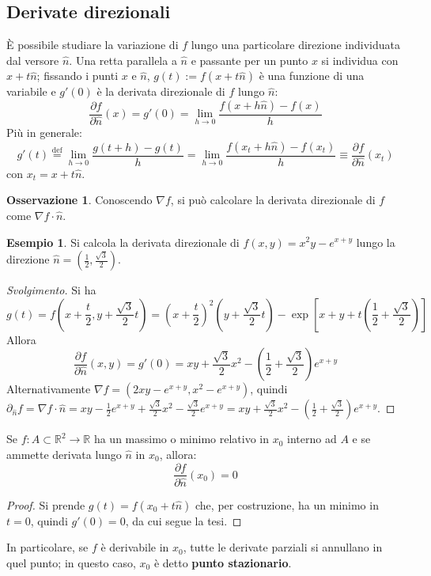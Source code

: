 \documentclass[11pt, a4paper]{scrartcl}
\newenvironment{svolgimento}{\renewcommand\qedsymbol{$\blacksquare$}\begin{proof}[Svolgimento]}{\end{proof}}
\theoremstyle{definition}
\newtheorem{esempio}{Esempio}
\numberwithin{esempio}{section}
\theoremstyle{definition}
\newtheorem{obs}{Osservazione}
\numberwithin{obs}{section}
\numberwithin{nota}{section}
\numberwithin{equation}{subsection}
\begin{document}
\subsection{Derivate direzionali}

\`E possibile studiare la variazione di $f$ lungo una particolare direzione individuata dal versore $\hat{n}$. Una retta parallela a $\hat{n}$ e passante per un punto $x$ si individua con $x+t \hat{n}$; fissando i punti $x$ e $\hat{n}$, $g(t) := f(x+t\hat{n})$ \`e una funzione di una variabile e $g'(0)$ \`e la derivata direzionale di $f$ lungo $\hat{n}$:
\begin{equation}
	\frac{\partial f}{\partial \hat{n}} (x) = g'(0) = \lim_{h \to 0} \frac{f(x+h\hat{n}) - f(x)}{h}
\end{equation}
Pi\`u in generale:
\begin{equation}
	g'(t) \overset{\text{def}}{=} \lim_{h \to 0} \frac{g(t+h) - g(t)}{h} = \lim_{h \to 0} \frac{f(x_t+ h \hat{n}) - f(x_t)}{h} \equiv \frac{\partial f}{\partial \hat{n}} (x_t)
\end{equation}
con $x_t = x+t \hat{n}$. 
\begin{obs}
	Conoscendo $\nabla f$, si pu\`o calcolare la derivata direzionale di $f$ come $\nabla f \cdot \hat{n}$.
\end{obs}
\begin{esempio}
	Si calcola la derivata direzionale di $f(x,y) = x^2 y - e^{x+y} $ lungo la direzione $\hat{n} = \left(\frac{1}{2}, \frac{\sqrt{3} }{2}\right) $.
	\begin{svolgimento}
		Si ha 
		\[
		g(t) = f\left(x + \frac{t}{2}, y + \frac{\sqrt{3} }{2}t\right) = \left(x + \frac{t}{2}\right) ^2 \left(y + \frac{\sqrt{3} }{2}t\right) - \exp \left[ x + y + t\left(\frac{1}{2} + \frac{\sqrt{3} }{2}\right)  \right] 
		\] 
		Allora 
		\[
		\frac{\partial f}{\partial \hat{n}} (x,y) = g'(0) = xy + \frac{\sqrt{3} }{2}x^2 - \left(\frac{1}{2}+ \frac{\sqrt{3} }{2} \right) e^{x+y} 
		\] 
		Alternativamente $\nabla f = \left(2xy - e^{x+y} , x^2 - e^{x+y} \right) $, quindi $\partial _{\hat{n}} f = \nabla f \cdot \hat{n} =xy - \frac{1}{2} e^{x+y} +\frac{\sqrt{3} }{2} x^2 - \frac{\sqrt{3} }{2}e^{x+y} = xy + \frac{\sqrt{3} }{2}x^2 - \left(\frac{1}{2}+\frac{\sqrt{3} }{2}\right) e^{x+y}   $.
	\end{svolgimento}
\end{esempio}
\begin{teorema}
	{}{}
	Se $f:A\subset \mathbb{R}^2 \to  \mathbb{R}$ ha un massimo o minimo relativo in $x_0$ interno ad $A$ e se ammette derivata lungo $\hat{n}$ in $x_0$, allora:
	\begin{equation}
		\frac{\partial f}{\partial \hat{n}} (x_0)= 0 
	\end{equation}
	\begin{proof}
		Si prende $g(t) = f(x_0 + t \hat{n})$ che, per costruzione, ha un minimo in $t=0$, quindi $g'(0) = 0$, da cui segue la tesi.
	\end{proof}
\end{teorema}
\noindent In particolare, se $f$ \`e derivabile in $x_0$, tutte le derivate parziali si annullano in quel punto; in questo caso, $x_0$ \`e detto \textbf{punto stazionario}.
\end{document}
